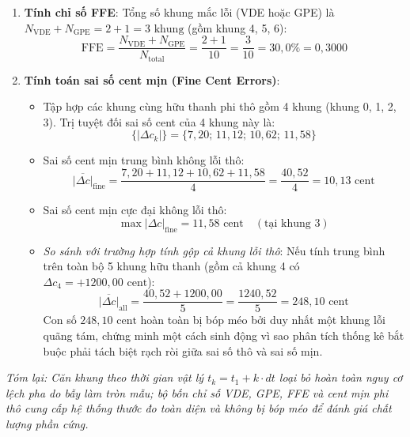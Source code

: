 \begin{enumerate}
    \item \textbf{Tính chỉ số FFE}:
    Tổng số khung mắc lỗi (VDE hoặc GPE) là $N_{\text{VDE}} + N_{\text{GPE}} = 2 + 1 = 3\text{ khung}$ (gồm khung 4, 5, 6):
    \begin{equation}
        \text{FFE} = \frac{N_{\text{VDE}} + N_{\text{GPE}}}{N_{\text{total}}} = \frac{2 + 1}{10} = \frac{3}{10} = 30{,}0\% = 0{,}3000
    \end{equation}

    \item \textbf{Tính toán sai số cent mịn (Fine Cent Errors)}:
    \begin{itemize}
        \item Tập hợp các khung cùng hữu thanh phi thô gồm 4 khung (khung 0, 1, 2, 3). Trị tuyệt đối sai số cent của 4 khung này là:
        \begin{equation}
            \{|\Delta c_k|\} = \{7{,}20;\, 11{,}12;\, 10{,}62;\, 11{,}58\}
        \end{equation}
        \item Sai số cent mịn trung bình không lỗi thô:
        \begin{equation}
            \overline{|\Delta c|}_{\text{fine}} = \frac{7{,}20 + 11{,}12 + 10{,}62 + 11{,}58}{4} = \frac{40{,}52}{4} = 10{,}13\text{ cent}
        \end{equation}
        \item Sai số cent mịn cực đại không lỗi thô:
        \begin{equation}
            \max |\Delta c|_{\text{fine}} = 11{,}58\text{ cent} \quad (\text{tại khung 3})
        \end{equation}
        \item \emph{So sánh với trường hợp tính gộp cả khung lỗi thô}: Nếu tính trung bình trên toàn bộ 5 khung hữu thanh (gồm cả khung 4 có $\Delta c_4 = +1200{,}00\text{ cent}$):
        \begin{equation}
            \overline{|\Delta c|}_{\text{all}} = \frac{40{,}52 + 1200{,}00}{5} = \frac{1240{,}52}{5} = 248{,}10\text{ cent}
        \end{equation}
        Con số $248{,}10\text{ cent}$ hoàn toàn bị bóp méo bởi duy nhất một khung lỗi quãng tám, chứng minh một cách sinh động vì sao phân tích thống kê bắt buộc phải tách biệt rạch ròi giữa sai số thô và sai số mịn.
    \end{itemize}
\end{enumerate}

\textit{Tóm lại: Căn khung theo thời gian vật lý $t_k = t_1 + k \cdot dt$ loại bỏ hoàn toàn nguy cơ lệch pha do bẫy làm tròn mẫu; bộ bốn chỉ số VDE, GPE, FFE và cent mịn phi thô cung cấp hệ thống thước đo toàn diện và không bị bóp méo để đánh giá chất lượng phần cứng.}

